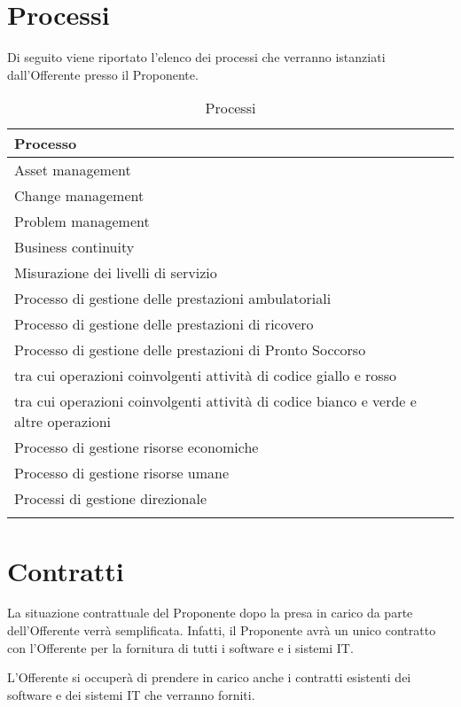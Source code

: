 	\section{Processi}
    	Di seguito viene riportato l'elenco dei processi che verranno istanziati dall'Offerente presso il Proponente.
        \renewcommand\arraystretch{1,5}
        \begin{longtable}{l}
        \toprule
        \textbf{Processo}\\
        \toprule
        Asset management\\
        Change management \\
        Problem management \\
        Business continuity \\
        Misurazione dei livelli di servizio \\
        Processo di gestione delle prestazioni ambulatoriali \\
        Processo di gestione delle prestazioni di ricovero \\
        Processo di gestione delle prestazioni di Pronto Soccorso \\
        \small{\hspace{0.5cm} tra cui operazioni coinvolgenti attività di codice giallo e rosso} \\
        \small{\hspace{0.5cm} tra cui operazioni coinvolgenti attività di codice bianco e verde e altre operazioni} \\
        Processo di gestione risorse economiche \\
        Processo di gestione risorse umane \\
        Processi di gestione direzionale \\
        \bottomrule
        \caption{Processi}
        \end{longtable}

	\section{Contratti}
		La situazione contrattuale del Proponente dopo la presa in carico da parte dell'Offerente verrà semplificata. Infatti, il Proponente avrà un unico contratto con l'Offerente per la fornitura di tutti i software e i sistemi IT.
        
        
        L'Offerente si occuperà di prendere in carico anche i contratti esistenti dei software e dei sistemi IT che verranno forniti.
        
